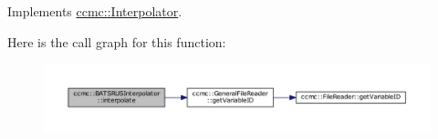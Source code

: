 Implements \hyperlink{classccmc_1_1_interpolator_ad5c1dd3693f83d75a2335b7c28cd649d}{ccmc\-::\-Interpolator}.



Here is the call graph for this function\-:
\nopagebreak
\begin{figure}[H]
\begin{center}
\leavevmode
\includegraphics[width=350pt]{classccmc_1_1_b_a_t_s_r_u_s_interpolator_a9a9a185e83767d1bfc9b1bb584cd250f_cgraph}
\end{center}
\end{figure}


